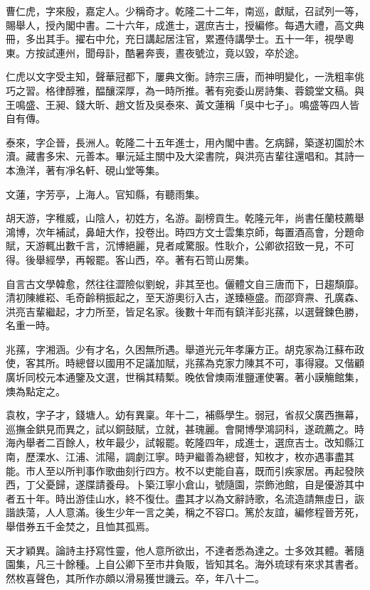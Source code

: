 \begin{pinyinscope}
曹仁虎，字來殷，嘉定人。少稱奇才。乾隆二十二年，南巡，獻賦，召試列一等，賜舉人，授內閣中書。二十六年，成進士，選庶吉士，授編修。每遇大禮，高文典冊，多出其手。擢右中允，充日講起居注官，累遷侍講學士。五十一年，視學粵東。方按試連州，聞母訃，酷暑奔喪，晝夜號泣，竟以毀，卒於途。

仁虎以文字受主知，聲華冠都下，屢典文衡。詩宗三唐，而神明變化，一洗粗率佻巧之習。格律醇雅，醖釀深厚，為一時所推。著有宛委山房詩集、蓉鏡堂文稿。與王鳴盛、王昶、錢大昕、趙文哲及吳泰來、黃文蓮稱「吳中七子」。鳴盛等四人皆自有傳。

泰來，字企晉，長洲人。乾隆二十五年進士，用內閣中書。乞病歸，築遂初園於木瀆。藏書多宋、元善本。畢沅延主關中及大梁書院，與洪亮吉輩往還唱和。其詩一本漁洋，著有凈名軒、硯山堂等集。

文蓮，字芳亭，上海人。官知縣，有聽雨集。

胡天游，字稚威，山陰人，初姓方，名游。副榜貢生。乾隆元年，尚書任蘭枝薦舉鴻博，次年補試，鼻衄大作，投卷出。時四方文士雲集京師，每置酒高會，分題命賦，天游輒出數千言，沉博絕麗，見者咸驚服。性耿介，公卿欲招致一見，不可得。後舉經學，再報罷。客山西，卒。著有石笥山房集。

自言古文學韓愈，然往往澀險似劉蛻，非其至也。儷體文自三唐而下，日趨頹靡。清初陳維崧、毛奇齡稍振起之，至天游奧衍入古，遂臻極盛。而邵齊燾、孔廣森、洪亮吉輩繼起，才力所至，皆足名家。後數十年而有鎮洋彭兆蓀，以選聲鍊色勝，名重一時。

兆蓀，字湘涵。少有才名，久困無所遇。舉道光元年孝廉方正。胡克家為江蘇布政使，客其所。時總督以國用不足議加賦，兆蓀為克家力陳其不可，事得寢。又偕顧廣圻同校元本通鑒及文選，世稱其精槧。晚依曾燠兩淮鹽運使署。著小謨觴館集，燠為點定之。

袁枚，字子才，錢塘人。幼有異稟。年十二，補縣學生。弱冠，省叔父廣西撫幕，巡撫金鉷見而異之，試以銅鼓賦，立就，甚瑰麗。會開博學鴻詞科，遂疏薦之。時海內舉者二百餘人，枚年最少，試報罷。乾隆四年，成進士，選庶吉士。改知縣江南，歷溧水、江浦、沭陽，調劇江寧。時尹繼善為總督，知枚才，枚亦遇事盡其能。市人至以所判事作歌曲刻行四方。枚不以吏能自喜，既而引疾家居。再起發陜西，丁父憂歸，遂牒請養母。卜築江寧小倉山，號隨園，崇飾池館，自是優游其中者五十年。時出游佳山水，終不復仕。盡其才以為文辭詩歌，名流造請無虛日，詼諧詄蕩，人人意滿。後生少年一言之美，稱之不容口。篤於友誼，編修程晉芳死，舉借券五千金焚之，且恤其孤焉。

天才穎異。論詩主抒寫性靈，他人意所欲出，不達者悉為達之。士多效其體。著隨園集，凡三十餘種。上自公卿下至市井負販，皆知其名。海外琉球有來求其書者。然枚喜聲色，其所作亦頗以滑易獲世譏云。卒，年八十二。


\end{pinyinscope}
